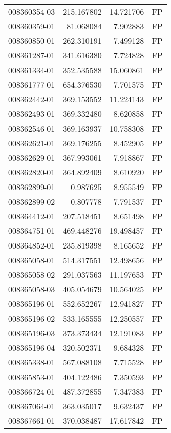 \begin{tabular}{lrrl}
008360354-03 &  215.167802 &    14.721706 &   FP \\
008360359-01 &   81.068084 &     7.902883 &   FP \\
008360850-01 &  262.310191 &     7.499128 &   FP \\
008361287-01 &  341.616380 &     7.724828 &   FP \\
008361334-01 &  352.535588 &    15.060861 &   FP \\
008361777-01 &  654.376530 &     7.701575 &   FP \\
008362442-01 &  369.153552 &    11.224143 &   FP \\
008362493-01 &  369.332480 &     8.620858 &   FP \\
008362546-01 &  369.163937 &    10.758308 &   FP \\
008362621-01 &  369.176255 &     8.452905 &   FP \\
008362629-01 &  367.993061 &     7.918867 &   FP \\
008362820-01 &  364.892409 &     8.610920 &   FP \\
008362899-01 &    0.987625 &     8.955549 &   FP \\
008362899-02 &    0.807778 &     7.791537 &   FP \\
008364412-01 &  207.518451 &     8.651498 &   FP \\
008364751-01 &  469.448276 &    19.498457 &   FP \\
008364852-01 &  235.819398 &     8.165652 &   FP \\
008365058-01 &  514.317551 &    12.498656 &   FP \\
008365058-02 &  291.037563 &    11.197653 &   FP \\
008365058-03 &  405.054679 &    10.564025 &   FP \\
008365196-01 &  552.652267 &    12.941827 &   FP \\
008365196-02 &  533.165555 &    12.250557 &   FP \\
008365196-03 &  373.373434 &    12.191083 &   FP \\
008365196-04 &  320.502371 &     9.684328 &   FP \\
008365338-01 &  567.088108 &     7.715528 &   FP \\
008365853-01 &  404.122486 &     7.350593 &   FP \\
008366724-01 &  487.372855 &     7.347383 &   FP \\
008367064-01 &  363.035017 &     9.632437 &   FP \\
008367661-01 &  370.038487 &    17.617842 &   FP \\

\end{tabular}
